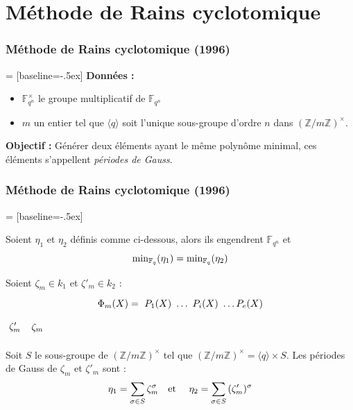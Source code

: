 \documentclass{beamer} %
\numberwithin{equation}{section}
\newcommand\zmodninv[1]{(\mathbb{Z}/#1\mathbb{Z})^{\times}}
\newcommand\GF[1]{\mathbb{F}_{#1}}
\newcommand\etmath{\textup{\quad et \quad}}
\newcommand\groupgen[1]{\langle{#1}\rangle}
\begin{document}
\section{Méthode de Rains cyclotomique}
\begin{frame}
\frametitle{Méthode de Rains cyclotomique (1996)}
 = [baseline=-.5ex]
\textbf{Données :}
\begin{itemize}
	\item $\GF{q^n}^{\times}$ le groupe multiplicatif de $\GF{q^n}$
	\item $m$ un entier tel que $\groupgen{q}$ soit l'unique sous-groupe d'ordre
$n$ dans $\zmodninv{m}$.
\end{itemize}
\vspace{0.3cm}
\textbf{Objectif :}
Générer deux éléments ayant le même polynôme minimal, ces éléments s'appellent
\emph{périodes de Gauss}.
\end{frame}
\begin{frame}
\frametitle{Méthode de Rains cyclotomique (1996)}
 = [baseline=-.5ex]
\begin{framed}
\begin{thm}
Soient $\eta_1$ et $\eta_2$ définis comme ci-dessous, alors ils engendrent
$\GF{q^n}$ et 
\[\textup{min}_{\GF{q}}(\eta_1) = \textup{min}_{\GF{q}}(\eta_2)\]
\end{thm}
\end{framed}
Soient $\zeta_m\in k_1$ et $\zeta'_m\in k_2$ :
\begin{equation*}
\Phi_m(X) = \tikz[baseline]{\node[anchor=base] (t1) {$P_1(X)$};} \dots 
\tikz[baseline]{\node[anchor=base] (t2) {$P_i(X)$};}
\dots P_e(X)
\end{equation*}
\hspace{4cm}
$\tikz\node [] (n1) {$\zeta'_m$};$
\hspace{0.8cm}
$\tikz\node [] (n2) {$\zeta_m$};$

Soit $S$ le sous-groupe de $\zmodninv{m}$ tel que $\zmodninv{m} = 
\groupgen{q}\times S$. Les périodes de Gauss de $\zeta_m$ et $\zeta'_m$ sont :
\[
\eta_1 = \sum_{\sigma\in S}{\zeta_m^{\sigma}}\etmath
\eta_2 = \sum_{\sigma\in S}{(\zeta'_m)^{\sigma}}
\]
\end{frame}
\end{document}
